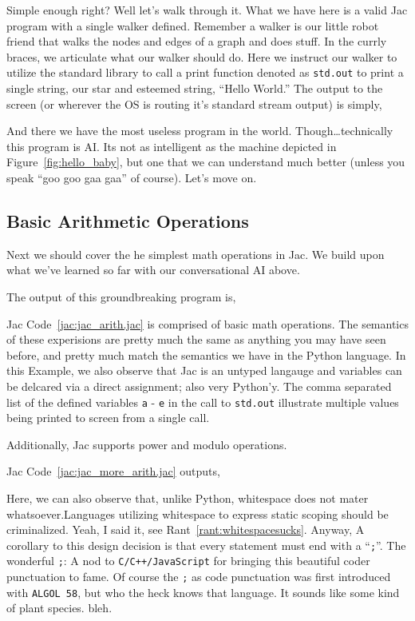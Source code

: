 
Simple enough right? Well let's walk through it. What we have here is a valid Jac program with a single walker defined. Remember a walker is our little robot friend that walks the nodes and edges of a graph and does stuff. In the currly braces, we articulate what our walker should do. Here we instruct our walker to utilize the standard library to call a print function denoted as \texttt{std.out} to print a single string, our star and esteemed string, ``Hello World.'' The output to the screen (or wherever the OS is routing it's standard stream output) is simply,


And there we have the most useless program in the world. Though\dots technically this program is AI. Its not as intelligent as the machine depicted in Figure~\ref{fig:hello_baby}, but one that we can understand much better (unless you speak ``\gls{goo goo gaa gaa}'' of course). Let's move on.

\subsection{Basic Arithmetic Operations}
Next we should cover the he simplest math operations in Jac. We build upon what we've learned so far with our conversational AI above.


The output of this groundbreaking program is,


Jac Code~\ref{jac:jac_arith.jac} is comprised of basic math operations. The semantics of these experisions are pretty much the same as anything you may have seen before, and pretty much match the semantics we have in the Python language. In this Example, we also observe that Jac is an untyped langauge and variables can be delcared via a direct assignment; also very Python'y. The comma separated list of the defined variables \texttt{a} - \texttt{e} in the call to \texttt{std.out} illustrate multiple values being printed to screen from a single call.
\par
Additionally, Jac supports power and modulo operations.


Jac Code~\ref{jac:jac_more_arith.jac} outputs,


Here, we can also observe that, unlike Python, whitespace does not mater whatsoever.Languages utilizing whitespace to express static scoping should be criminalized. Yeah, I said it, see Rant~\ref{rant:whitespacesucks}. Anyway, A corollary to this design decision is that every statement must end with a ``\texttt{;}''. The wonderful \texttt{;}: A nod to \texttt{C/C++/JavaScript} for bringing this beautiful coder punctuation to fame. Of course the \texttt{;} as code punctuation was first introduced with \texttt{ALGOL 58}, but who the heck knows that language. It sounds like some kind of plant species. \Gls{bleh}.